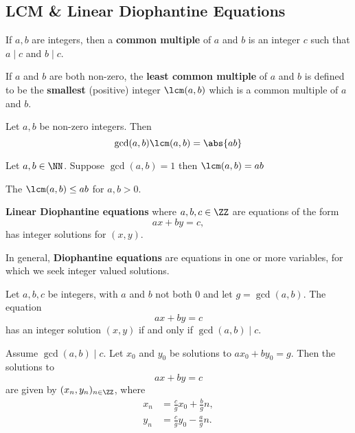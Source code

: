 \documentclass[12pt, a4paper]{article}
\begin{document}
\subsection{LCM \& Linear Diophantine Equations}

\begin{definition}
    If \(a,b\) are integers, then a \textbf{common multiple} of \(a\) and \(b\) is an integer \(c\) such that \(a\mid c\) and \(b\mid c\).
\end{definition}

\begin{definition}
    If \(a\) and \(b\) are both non-zero, the \textbf{least common multiple} of \(a\) and \(b\) is defined to be the \textbf{smallest} (positive) integer \(\lcm(a,b)\) which is a common multiple of \(a\) and \(b\).
\end{definition}

\begin{proposition}
    Let \(a,b\) be non-zero integers. Then \[\gcd(a,b)\lcm(a,b)=\abs{ab}\]
\end{proposition}

\begin{corollary}
    Let \(a,b \in \NN\). Suppose \(\gcd(a,b)=1\) then \(\lcm(a,b)=ab\)
\end{corollary}

\begin{mdremark}
    The \(\lcm(a,b) \leq ab\) for \(a,b>0\).
    \end{mdremark}

\begin{definition}
    \textbf{Linear Diophantine equations} where \(a,b,c \in \ZZ\) are equations of the form \[ax+by=c,\] has integer solutions for \((x,y)\).
\end{definition}

\begin{mdnote}
    In general, \textbf{Diophantine equations} are equations in one or more variables, for which we seek integer valued solutions.
\end{mdnote}

\begin{theorem}
    Let \(a,b,c\) be integers, with \(a\) and \(b\) not both \(0\) and let \(g=\gcd(a,b)\). The equation
    \[ax+by=c\] 
    has an integer solution \((x,y)\) if and only if \(\gcd(a,b) \mid c\).
\end{theorem}

\begin{mdthm}
Assume \(\gcd(a,b) \mid c\). Let \(x_0\) and \(y_0\) be solutions to \(ax_0+by_0=g\). Then the solutions to 
\[ax+by=c\]
are given by \((x_n,y_n)_{n\in \ZZ}\), where 
\[\begin{aligned}
    x_n &= \frac{c}{g}x_0+\frac{b}{g}n, \\
    y_n &= \frac{c}{g}y_0-\frac{a}{g}n.
\end{aligned}\]
\end{mdthm}
\end{document}
